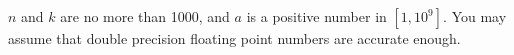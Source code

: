 $n$ and $k$ are no more than 1000, and $a$ is a positive number in $[1,10^9]$.
You may assume that double precision floating point numbers are accurate enough.
\newpage

